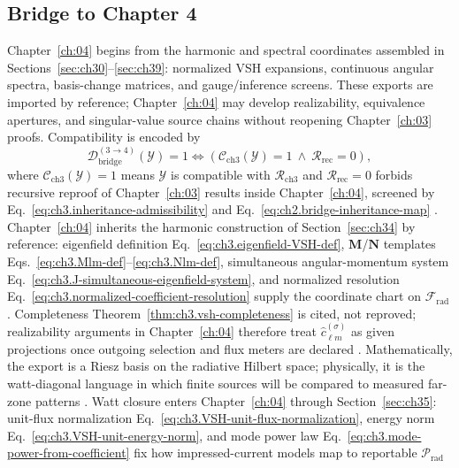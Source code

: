 \subsection{Bridge to Chapter 4}
\label{sec:ch3113}
Chapter~\ref{ch:04} begins from the harmonic and spectral coordinates assembled in Sections~\ref{sec:ch30}--\ref{sec:ch39}:
normalized VSH expansions, continuous angular spectra, basis-change matrices, and gauge/inference screens. These exports are
imported by reference; Chapter~\ref{ch:04} may develop realizability, equivalence apertures, and singular-value source chains
without reopening Chapter~\ref{ch:03} proofs. Compatibility is encoded by
\begin{equation}
\label{eq:ch3.bridge-inheritance-map}
\mathcal{D}_{\mathrm{bridge}}^{(3\to 4)}(\mathcal{Y})=1
\iff
\left(
\mathcal{C}_{\mathrm{ch3}}(\mathcal{Y})=1\
\wedge\
\mathcal{R}_{\mathrm{rec}}=0
\right),
\end{equation}
where \(\mathcal{C}_{\mathrm{ch3}}(\mathcal{Y})=1\) means \(\mathcal{Y}\) is compatible with \(\mathcal{R}_{\mathrm{ch3}}\) and \(\mathcal{R}_{\mathrm{rec}}=0\) forbids recursive reproof of Chapter~\ref{ch:03} results inside Chapter~\ref{ch:04},
screened by Eq.~\eqref{eq:ch3.inheritance-admissibility} and Eq.~\eqref{eq:ch2.bridge-inheritance-map}
\cite{stratton1941}.
Chapter~\ref{ch:04} inherits the harmonic construction of Section~\ref{sec:ch34} by reference: eigenfield definition
Eq.~\eqref{eq:ch3.eigenfield-VSH-def}, \(\mathbf{M}\)/\(\mathbf{N}\) templates Eqs.~\eqref{eq:ch3.Mlm-def}--\eqref{eq:ch3.Nlm-def},
simultaneous angular-momentum system Eq.~\eqref{eq:ch3.J-simultaneous-eigenfield-system}, and normalized resolution
Eq.~\eqref{eq:ch3.normalized-coefficient-resolution} supply the coordinate chart on \(\mathcal{F}_{\mathrm{rad}}\)
\cite{hansen1988}. Completeness Theorem~\ref{thm:ch3.vsh-completeness} is cited, not reproved; realizability
arguments in Chapter~\ref{ch:04} therefore treat \(\widehat{c}_{\ell m}^{(\sigma)}\) as given projections once outgoing selection and
flux meters are declared \cite{kato1995}. Mathematically, the export is a Riesz basis on the radiative Hilbert space;
physically, it is the watt-diagonal language in which finite sources will be compared to measured far-zone patterns
\cite{poynting1884}.
Watt closure enters Chapter~\ref{ch:04} through Section~\ref{sec:ch35}: unit-flux normalization
Eq.~\eqref{eq:ch3.VSH-unit-flux-normalization}, energy norm Eq.~\eqref{eq:ch3.VSH-unit-energy-norm}, and mode power law
Eq.~\eqref{eq:ch3.mode-power-from-coefficient} fix how impressed-current models map to reportable \(\mathcal{P}_{\mathrm{rad}}\)
